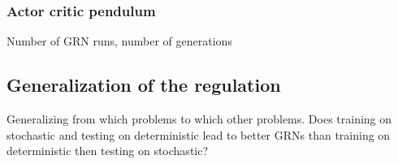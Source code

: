 \subsubsection{Actor critic pendulum}

Number of GRN runs, number of generations

\subsection{Generalization of the regulation}

Generalizing from which problems to which other problems. Does training on stochastic and testing on deterministic lead to better GRNs than training on
deterministic then testing on stochastic?

